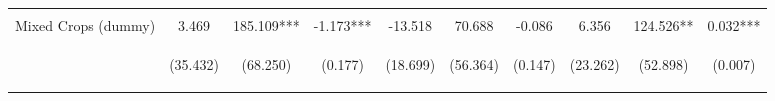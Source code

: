 \begin{center}
\begin{tabular}{lccccccccc}
\vspace{4pt} & \begin{footnotesize}[0.180]\end{footnotesize} & \begin{footnotesize}[0.018]\end{footnotesize} & \begin{footnotesize}[0.209]\end{footnotesize} & \begin{footnotesize}[0.436]\end{footnotesize} & \begin{footnotesize}[0.172]\end{footnotesize} & \begin{footnotesize}[0.003]\end{footnotesize} & \begin{footnotesize}[0.745]\end{footnotesize} & \begin{footnotesize}[0.101]\end{footnotesize} & \begin{footnotesize}[0.314]\end{footnotesize} \\
Mixed Crops (dummy) & 3.469 & 185.109*** & -1.173*** & -13.518 & 70.688 & -0.086 & 6.356 & 124.526** & 0.032*** \\
 & \begin{footnotesize}(35.432)\end{footnotesize} & \begin{footnotesize}(68.250)\end{footnotesize} & \begin{footnotesize}(0.177)\end{footnotesize} & \begin{footnotesize}(18.699)\end{footnotesize} & \begin{footnotesize}(56.364)\end{footnotesize} & \begin{footnotesize}(0.147)\end{footnotesize} & \begin{footnotesize}(23.262)\end{footnotesize} & \begin{footnotesize}(52.898)\end{footnotesize} & \begin{footnotesize}(0.007)\end{footnotesize} \\

\end{tabular}
\end{center}
